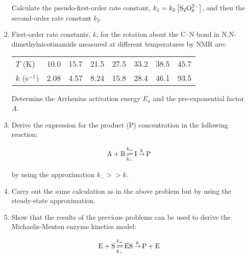 \begin{enumerate}
\noindent
Calculate the pseudo-first-order rate constant, $k_1 = k_2\left[\textnormal{S}_2\textnormal{O}_8^{2-}\right]$, and then the second-order rate constant $k_2$.\\


\item First-order rate constants, $k$, for the rotation about the C--N bond in N,N-dimethylnicotinamide measured at different temperatures by NMR are:

\begin{tabular}{llllllll}
$T$ (K) & 10.0 & 15.7 & 21.5 & 27.5 & 33.2 & 38.5 & 45.7\\
$k$ (s$^{-1}$) & 2.08 & 4.57 & 8.24 & 15.8 & 28.4 & 46.1 & 93.5\\
\end{tabular}

\noindent
Determine the Arrhenius activation energy $E_a$ and the pre-exponential factor $A$.\\


\item Derive the expression for the product (P) concentration in the following reaction:

$$\textnormal{A} + \textnormal{B} \mathop {\rightleftharpoons}\limits^{k_+}_{k_-} \textnormal{I} \mathop {\rightarrow}\limits^{k} \textnormal{P}$$

\noindent
by using the approximation $k_- >> k$.\\


\item Carry out the same calculation as in the above problem but by using the steady-state approximation.\\


\item Show that the results of the previous problems can be used to derive the Michaelis-Menten enzyme kinetics model:

$$\textnormal{E} + \textnormal{S} \mathop {\rightleftharpoons}\limits^{k_+}_{k_-} \textnormal{ES} \mathop {\rightarrow}\limits^{k} \textnormal{P} + \textnormal{E}$$


\end{enumerate}
